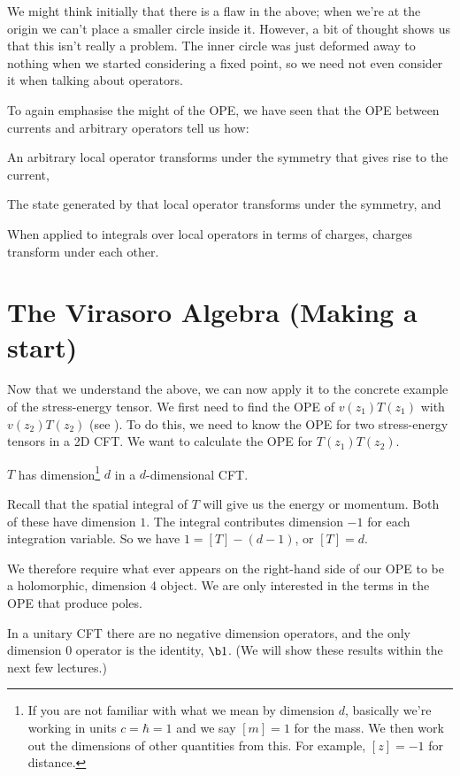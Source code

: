 \br 
    We might think initially that there is a flaw in the above; when we're at the origin we can't place a smaller circle inside it. However, a bit of thought shows us that this isn't really a problem. The inner circle was just deformed away to nothing when we started considering a fixed point, so we need not even consider it when talking about operators. 
\er 

\br 
    To again emphasise the might of the OPE, we have seen that the OPE between currents and arbitrary operators tell us how:
    \ben
        \item An arbitrary local operator transforms under the symmetry that gives rise to the current, 
        \item The state generated by that local operator transforms under the symmetry, and
        \item When applied to integrals over local operators in terms of charges, charges transform under each other. 
    \een
\er 

\section{The Virasoro Algebra (Making a start)}

Now that we understand the above, we can now apply it to the concrete example of the stress-energy tensor. We first need to find the OPE of $v(z_1)T(z_1)$ with $v(z_2)T(z_2)$ (see ). To do this, we need to know the OPE for two stress-energy tensors in a 2D CFT. We want to calculate the OPE for $T(z_1)T(z_2)$. 

\bp 
    $T$ has dimension\footnote{If you are not familiar with what we mean by dimension $d$, basically we're working in units $c=\hbar=1$ and we say $[m]=1$ for the mass. We then work out the dimensions of other quantities from this. For example, $[z]=-1$ for distance.} $d$ in a $d$-dimensional CFT.
\ep 

\bq
    Recall that the spatial integral of $T$ will give us the energy or momentum. Both of these have dimension $1$. The integral contributes dimension $-1$ for each integration variable. So we have $1=[T]-(d-1)$, or $[T]=d$. 
\eq

We therefore require what ever appears on the right-hand side of our OPE to be a holomorphic, dimension 4 object. We are only interested in the terms in the OPE that produce poles. 

\bcl 
    In a unitary CFT there are no negative dimension operators, and the only dimension 0 operator is the identity, $\b1$. (We will show these results within the next few lectures.)
\ecl 

